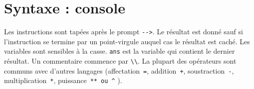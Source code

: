 \section{Syntaxe : console}
Les instructions sont tapées après le prompt \verb?-->?. Le résultat est donné 
sauf si l'instruction se termine par un point-virgule auquel cas le résultat 
est caché. Les variables sont sensibles à la casse. \verb?ans? est la variable 
qui contient le dernier résultat. Un commentaire commence par  \verb?\\?. 
La plupart des opérateurs sont communs avec d'autres langages 
(affectation~\verb?=?, addition~\verb?+?, soustraction~\verb?-?, 
multiplication~\verb?*?, puissance~\verb?** ou ^? ).

